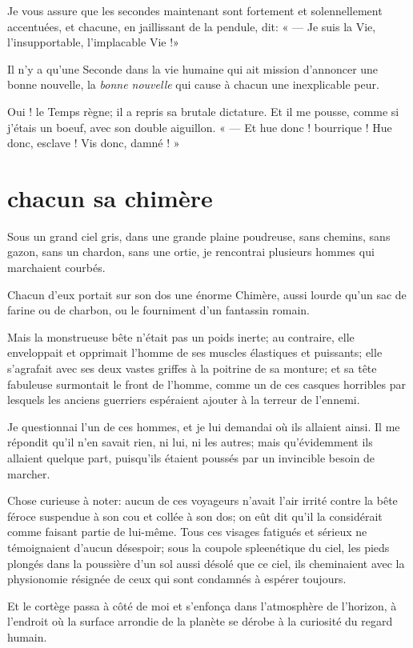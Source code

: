 Je vous assure que les secondes maintenant sont fortement et
solennellement accentuées, et chacune, en jaillissant de la pendule,
dit: « --- Je suis la Vie, l’insupportable,
l’implacable Vie !»

Il n’y a qu’une Seconde dans la vie
humaine qui ait mission d’annoncer une bonne nouvelle,
la \textit{bonne nouvelle} qui cause à chacun une inexplicable peur.

Oui ! le Temps règne; il a repris sa brutale dictature. Et il me pousse,
comme si j’étais un boeuf, avec son double aiguillon.
« --- Et hue donc ! bourrique ! Hue donc, esclave ! Vis donc, damné ! »


\quebra\section[Chacun sa chimère]{chacun sa chimère }

Sous un grand ciel gris, dans une grande plaine poudreuse, sans chemins,
sans gazon, sans un chardon, sans une ortie, je rencontrai plusieurs
hommes qui marchaient courbés.

Chacun d’eux portait sur son dos une énorme Chimère,
aussi lourde qu’un sac de farine ou de charbon, ou le
fourniment d’un fantassin romain.

Mais la monstrueuse bête n’était pas un poids inerte;
au contraire, elle enveloppait et opprimait l’homme de
ses muscles élastiques et puissants; elle s’agrafait
avec ses deux vastes griffes à la poitrine de sa monture; et sa tête
fabuleuse surmontait le front de l’homme, comme un de
ces casques horribles par lesquels les anciens guerriers espéraient
ajouter à la terreur de l’ennemi.

Je questionnai l’un de ces hommes, et je lui demandai
où ils allaient ainsi. Il me répondit qu’il
n’en savait rien, ni lui, ni les autres; mais
qu’évidemment ils allaient quelque part,
puisqu’ils étaient poussés par un invincible besoin de
marcher.

Chose curieuse à noter: aucun de ces voyageurs n’avait
l’air irrité contre la bête féroce suspendue à son cou
et collée à son dos; on eût dit qu’il la considérait
comme faisant partie de lui{}-même. Tous ces visages fatigués et
sérieux ne témoignaient d’aucun désespoir; sous la
coupole spleenétique du ciel, les pieds plongés dans la poussière
d’un sol aussi désolé que ce ciel, ils cheminaient
avec la physionomie résignée de ceux qui sont condamnés à espérer
toujours.

Et le cortège passa à côté de moi et s’enfonça dans
l’atmosphère de l’horizon, à
l’endroit où la surface arrondie de la planète se
dérobe à la curiosité du regard humain.

